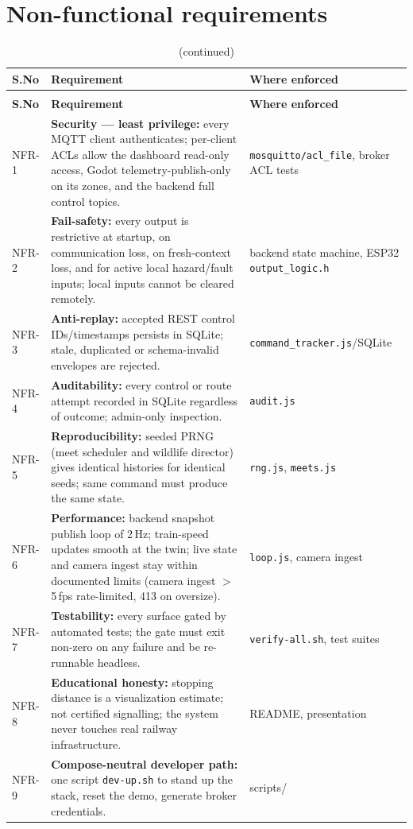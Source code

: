 \section{Non-functional requirements}

\begin{longtable}{>{\raggedright}p{0.8cm} >{\raggedright\arraybackslash}p{10.7cm} l}
\caption{Non-functional requirements}\label{tab:nonfunctional}\\
\toprule
\textbf{S.No} & \textbf{Requirement} & \textbf{Where enforced} \\
\midrule
\endfirsthead
\caption[]{(continued)}\\
\toprule
\textbf{S.No} & \textbf{Requirement} & \textbf{Where enforced} \\
\midrule
\endhead
NFR-1 & \textbf{Security --- least privilege:} every MQTT client authenticates; per-client ACLs allow the dashboard read-only access, Godot telemetry-publish-only on its zones, and the backend full control topics. & \texttt{mosquitto/acl\_file}, broker ACL tests \\
NFR-2 & \textbf{Fail-safety:} every output is restrictive at startup, on communication loss, on fresh-context loss, and for active local hazard/fault inputs; local inputs cannot be cleared remotely. & backend state machine, ESP32 \texttt{output\_logic.h} \\
NFR-3 & \textbf{Anti-replay:} accepted REST control IDs/timestamps persists in SQLite; stale, duplicated or schema-invalid envelopes are rejected. & \texttt{command\_tracker.js}/SQLite \\
NFR-4 & \textbf{Auditability:} every control or route attempt recorded in SQLite regardless of outcome; admin-only inspection. & \texttt{audit.js} \\
NFR-5 & \textbf{Reproducibility:} seeded PRNG (meet scheduler and wildlife director) gives identical histories for identical seeds; same command must produce the same state. & \texttt{rng.js}, \texttt{meets.js} \\
NFR-6 & \textbf{Performance:} backend snapshot publish loop of 2\,Hz; train-speed updates smooth at the twin; live state and camera ingest stay within documented limits (camera ingest $>$5\,fps rate-limited, 413 on oversize). & \texttt{loop.js}, camera ingest \\
NFR-7 & \textbf{Testability:} every surface gated by automated tests; the gate must exit non-zero on any failure and be re-runnable headless. & \texttt{verify-all.sh}, test suites \\
NFR-8 & \textbf{Educational honesty:} stopping distance is a visualization estimate; not certified signalling; the system never touches real railway infrastructure. & README, presentation \\
NFR-9 & \textbf{Compose-neutral developer path:} one script \texttt{dev-up.sh} to stand up the stack, reset the demo, generate broker credentials. & scripts/ \\
\bottomrule
\end{longtable}


